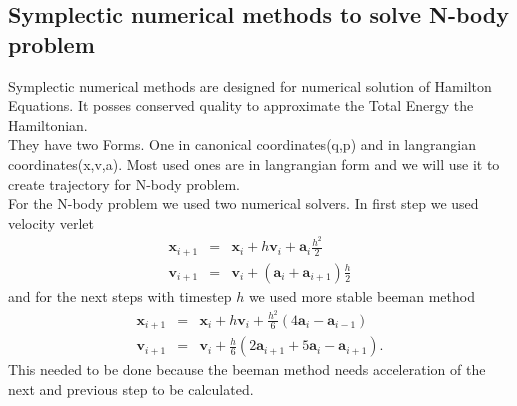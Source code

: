 \subsection{Symplectic numerical methods to solve N-body problem}
Symplectic numerical methods are designed for numerical solution of Hamilton Equations. It posses conserved quality to approximate the Total Energy the Hamiltonian.\\
They have two Forms. One in canonical coordinates(q,p) and in langrangian coordinates(x,v,a). Most used ones are in langrangian form and we will use it to create trajectory for N-body problem.\\
For the N-body problem we used two numerical solvers. In first step we used velocity verlet
\begin{eqnarray}
	\mathbf{x}_{i+1} &=& \mathbf{x}_i + h\mathbf{v}_i + \mathbf{a}_i\frac{h^2}{2} \\
	\mathbf{v}_{i+1}&=&\mathbf{v}_i + (\mathbf{a}_i +\mathbf{a}_{i+1})\frac{h}{2}
\end{eqnarray} and
for the next steps with timestep $h$ we used more stable beeman method
\begin{eqnarray}
	\mathbf{x}_{i+1} &=& \mathbf{x}_i + h\mathbf{v}_i + \frac{h^2}{6}(4\mathbf{a}_{i}-\mathbf{a}_{i-1})\\
	\mathbf{v}_{i+1}&=&\mathbf{v}_i + \frac{h}{6}(2\mathbf{a}_{i+1} + 5\mathbf{a}_i-\mathbf{a}_{i+1}).
\end{eqnarray}
This needed to be done because the beeman method needs acceleration of the next and previous step to be calculated.
